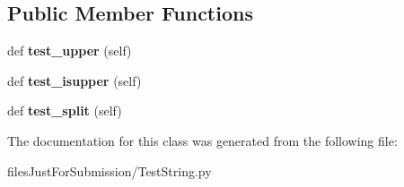 \subsection*{Public Member Functions}
\begin{DoxyCompactItemize}
\item 
def {\bfseries test\+\_\+upper} (self)\hypertarget{class_test_string_1_1_test_string_methods_abd3a37be3b26c3bf46c303db0c03b7e5}{}\label{class_test_string_1_1_test_string_methods_abd3a37be3b26c3bf46c303db0c03b7e5}

\item 
def {\bfseries test\+\_\+isupper} (self)\hypertarget{class_test_string_1_1_test_string_methods_a6529ba420211e4577fa0c79ab7b20e1a}{}\label{class_test_string_1_1_test_string_methods_a6529ba420211e4577fa0c79ab7b20e1a}

\item 
def {\bfseries test\+\_\+split} (self)\hypertarget{class_test_string_1_1_test_string_methods_a3e28d67b465886b07c81361541ce839f}{}\label{class_test_string_1_1_test_string_methods_a3e28d67b465886b07c81361541ce839f}

\end{DoxyCompactItemize}


The documentation for this class was generated from the following file\+:\begin{DoxyCompactItemize}
\item 
files\+Just\+For\+Submission/Test\+String.\+py\end{DoxyCompactItemize}
